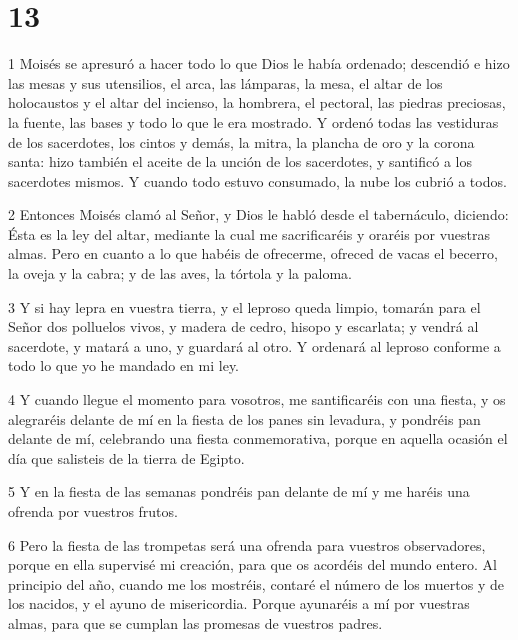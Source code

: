 \chapter{13}

\par 1 Moisés se apresuró a hacer todo lo que Dios le había ordenado; descendió e hizo las mesas y sus utensilios, el arca, las lámparas, la mesa, el altar de los holocaustos y el altar del incienso, la hombrera, el pectoral, las piedras preciosas, la fuente, las bases y todo lo que le era mostrado. Y ordenó todas las vestiduras de los sacerdotes, los cintos y demás, la mitra, la plancha de oro y la corona santa: hizo también el aceite de la unción de los sacerdotes, y santificó a los sacerdotes mismos. Y cuando todo estuvo consumado, la nube los cubrió a todos.

\par 2 Entonces Moisés clamó al Señor, y Dios le habló desde el tabernáculo, diciendo: Ésta es la ley del altar, mediante la cual me sacrificaréis y oraréis por vuestras almas. Pero en cuanto a lo que habéis de ofrecerme, ofreced de vacas el becerro, la oveja y la cabra; y de las aves, la tórtola y la paloma.

\par 3 Y si hay lepra en vuestra tierra, y el leproso queda limpio, tomarán para el Señor dos polluelos vivos, y madera de cedro, hisopo y escarlata; y vendrá al sacerdote, y matará a uno, y guardará al otro. Y ordenará al leproso conforme a todo lo que yo he mandado en mi ley.

\par 4 Y cuando llegue el momento para vosotros, me santificaréis con una fiesta, y os alegraréis delante de mí en la fiesta de los panes sin levadura, y pondréis pan delante de mí, celebrando una fiesta conmemorativa, porque en aquella ocasión el día que salisteis de la tierra de Egipto.

\par 5 Y en la fiesta de las semanas pondréis pan delante de mí y me haréis una ofrenda por vuestros frutos.

\par 6 Pero la fiesta de las trompetas será una ofrenda para vuestros observadores, porque en ella supervisé mi creación, para que os acordéis del mundo entero. Al principio del año, cuando me los mostréis, contaré el número de los muertos y de los nacidos, y el ayuno de misericordia. Porque ayunaréis a mí por vuestras almas, para que se cumplan las promesas de vuestros padres.

